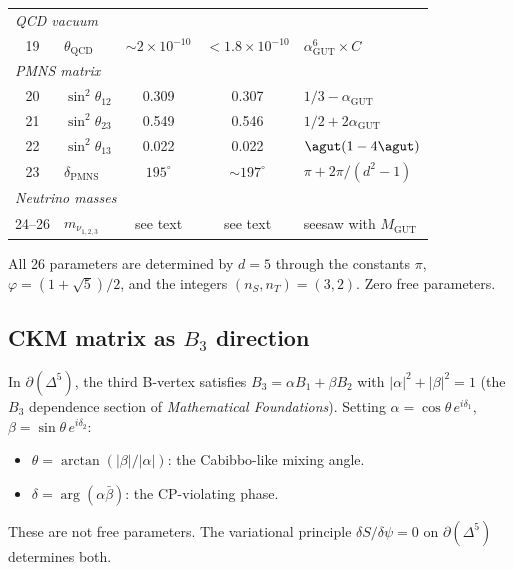 \begin{center}
\begin{tabular}{clccl}
\hline
\multicolumn{5}{l}{\emph{QCD vacuum}} \\
19 & $\theta_\text{QCD}$ & $\sim 2\!\times\! 10^{-10}$ & $< 1.8\!\times\! 10^{-10}$ & $\alpha_\text{GUT}^6 \times C$ \\
\hline
\multicolumn{5}{l}{\emph{PMNS matrix}} \\
20 & $\sin^2\theta_{12}$ & 0.309 & 0.307 & $1/3 - \alpha_\text{GUT}$ \\
21 & $\sin^2\theta_{23}$ & 0.549 & 0.546 & $1/2 + 2\alpha_\text{GUT}$ \\
22 & $\sin^2\theta_{13}$ & 0.022 & 0.022 & $\agut(1-4\agut)$ \\
23 & $\delta_\text{PMNS}$ & $195^\circ$ & $\sim 197^\circ$ & $\pi + 2\pi/(d^2\!-\!1)$ \\
\hline
\multicolumn{5}{l}{\emph{Neutrino masses}} \\
24--26 & $m_{\nu_{1,2,3}}$ & see text & see text & seesaw with $M_\text{GUT}$ \\
\hline
\end{tabular}
\end{center}

\medskip
\noindent All 26 parameters are determined by $d = 5$ through the constants $\pi$, $\varphi = (1+\sqrt{5})/2$, and the integers $(n_S, n_T) = (3, 2)$. Zero free parameters.

\subsection{CKM matrix as $B_3$ direction}
\label{sec:ckm_geometry}

In $\partial(\Delta^5)$, the third B-vertex satisfies $B_3 = \alpha B_1 + \beta B_2$ with $|\alpha|^2 + |\beta|^2 = 1$ (the $B_3$ dependence section of \textit{Mathematical Foundations}).  Setting $\alpha = \cos\theta\,e^{i\delta_1}$, $\beta = \sin\theta\,e^{i\delta_2}$:

\begin{itemize}
\item $\theta = \arctan(|\beta|/|\alpha|)$: the Cabibbo-like mixing angle.
\item $\delta = \arg(\alpha\bar\beta)$: the CP-violating phase.
\end{itemize}

These are not free parameters.  The variational principle $\delta S/\delta\psi = 0$ on $\partial(\Delta^5)$ determines both.


